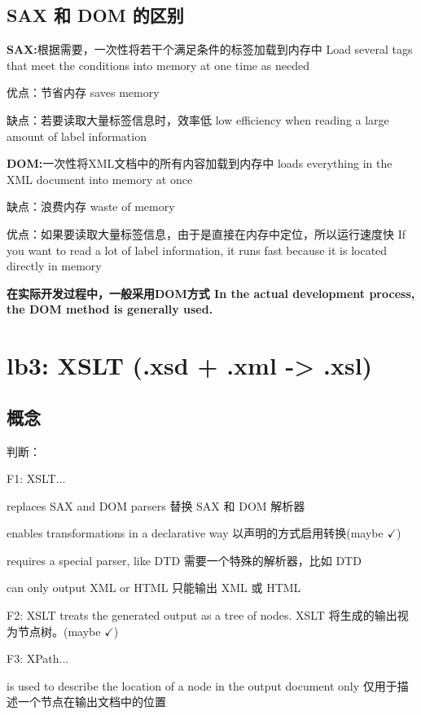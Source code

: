 \documentclass[fontset=windows]{article}
\begin{document}
\subsection{SAX 和 DOM 的区别}

\textbf{SAX:}根据需要，一次性将若干个满足条件的标签加载到内存中 Load several tags that meet the conditions into memory at one time as needed

\indent\indent 优点：节省内存 saves memory

\indent\indent 缺点：若要读取大量标签信息时，效率低 low efficiency when reading a large amount of label information

\textbf{DOM:}一次性将XML文档中的所有内容加载到内存中 loads everything in the XML document into memory at once

\indent\indent 缺点：浪费内存 waste of memory

\indent\indent 优点：如果要读取大量标签信息，由于是直接在内存中定位，所以运行速度快 If you want to read a lot of label information, it runs fast because it is located directly in memory

\textbf{在实际开发过程中，一般采用DOM方式 In the actual development process, the DOM method is generally used.}

\section{lb3: XSLT (.xsd + .xml -> .xsl)}

\subsection{概念}

判断：

F1: XSLT...

\indent\indent replaces SAX and DOM parsers 替换 SAX 和 DOM 解析器

\indent\indent enables transformations in a declarative way 以声明的方式启用转换(maybe $\checkmark$)

\indent\indent requires a special parser, like DTD 需要一个特殊的解析器，比如 DTD

\indent\indent can only output XML or HTML 只能输出 XML 或 HTML

F2: XSLT treats the generated output as a tree of nodes. XSLT 将生成的输出视为节点树。(maybe $\checkmark$)

F3: XPath...

\indent\indent is used to describe the location of a node in the output document only
仅用于描述一个节点在输出文档中的位置
\end{document}
